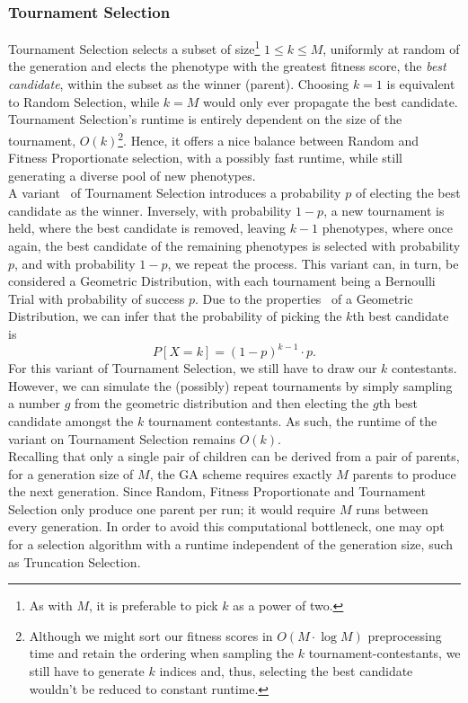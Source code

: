 \subsubsection{Tournament Selection}
Tournament Selection selects a subset of size\footnote{As with $M$, it is preferable to pick $k$ as a power of two.} $1 \leq k \leq M$, uniformly at random of the generation and elects the phenotype with the greatest fitness score, the \textit{best candidate}, within the subset as the winner (parent). Choosing $k = 1 $ is equivalent to Random Selection, while $k = M$ would only ever propagate the best candidate.
\\
Tournament Selection's runtime is entirely dependent on the size of the tournament, $O(k)$\footnote{Although we might sort our fitness scores in $O(M \cdot \log M)$ preprocessing time and retain the ordering when sampling the $k$ tournament-contestants, we still have to generate $k$ indices and, thus, selecting the best candidate wouldn't be reduced to constant runtime.}. Hence, it offers a nice balance between Random and Fitness Proportionate selection, with a possibly fast runtime, while still generating a diverse pool of new phenotypes.
\\
A variant~\cite{Wiki-tournament-selection} of Tournament Selection introduces a probability $p$ of electing the best candidate as the winner. Inversely, with probability $1-p$, a new tournament is held, where the best candidate is removed, leaving $k-1$ phenotypes, where once again, the best candidate of the remaining phenotypes is selected with probability $p$, and with probability $1-p$, we repeat the process. This variant can, in turn, be considered a Geometric Distribution, with each tournament being a Bernoulli Trial with probability of success $p$. Due to the properties~\cite{Wiki-geometric-distribution} of a Geometric Distribution, we can infer that the probability of picking the $k$th best candidate is
\begin{equation*}
    P\left[ X = k \right] = (1-p)^{k-1} \cdot p.
\end{equation*}
For this variant of Tournament Selection, we still have to draw our $k$ contestants. However, we can simulate the (possibly) repeat tournaments by simply sampling a number $g$ from the geometric distribution and then electing the $g$th best candidate amongst the $k$ tournament contestants. As such, the runtime of the variant on Tournament Selection remains $O(k)$.
\\
Recalling that only a single pair of children can be derived from a pair of parents, for a generation size of $M$, the GA scheme requires exactly $M$ parents to produce the next generation. Since Random, Fitness Proportionate and Tournament Selection only produce one parent per run; it would require $M$ runs between every generation. In order to avoid this computational bottleneck, one may opt for a selection algorithm with a runtime independent of the generation size, such as Truncation Selection.

